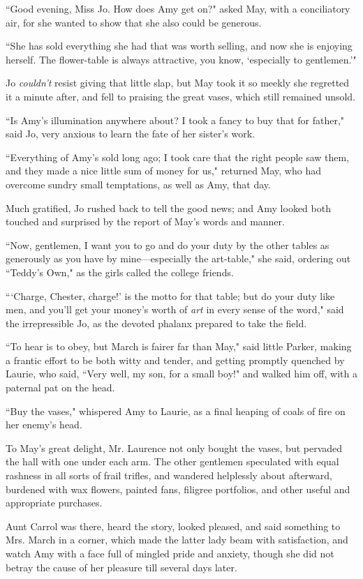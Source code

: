 ``Good evening, Miss Jo. How does Amy get on?" asked May, with a
conciliatory air, for she wanted to show that she also could be
generous.

``She has sold everything she had that was worth selling, and now she is
enjoying herself. The flower-table is always attractive, you know,
`especially to gentlemen.'"

Jo \emph{couldn't} resist giving that little slap, but
May took it so meekly she regretted it a minute after, and fell to
praising the great vases, which still remained unsold.

``Is Amy's illumination anywhere about? I took a fancy to
buy that for father," said Jo, very anxious to learn the fate of her
sister's work.

``Everything of Amy's sold long ago; I took care that the
right people saw them, and they made a nice little sum of money for us,"
returned May, who had overcome sundry small temptations, as well as Amy,
that day.

Much gratified, Jo rushed back to tell the good news; and Amy looked
both touched and surprised by the report of May's words
and manner.

``Now, gentlemen, I want you to go and do your duty by the other tables
as generously as you have by mine---especially the art-table," she said,
ordering out ``Teddy's Own," as the girls called the
college friends.

```Charge, Chester, charge!' is the
motto for that table; but do your duty like men, and
you'll get your money's worth of
\emph{art} in every sense of the word," said the irrepressible Jo, as
the devoted phalanx prepared to take the field.

``To hear is to obey, but March is fairer far than May," said little
Parker, making a frantic effort to be both witty and tender, and getting
promptly quenched by Laurie, who said, ``Very well, my son, for a small
boy!" and walked him off, with a paternal pat on the head.

``Buy the vases," whispered Amy to Laurie, as a final heaping of coals of
fire on her enemy's head.

To May's great delight, Mr. Laurence not only bought the
vases, but pervaded the hall with one under each arm. The other
gentlemen speculated with equal rashness in all sorts of frail trifles,
and wandered helplessly about afterward, burdened with wax flowers,
painted fans, filigree portfolios, and other useful and appropriate
purchases.

Aunt Carrol was there, heard the story, looked pleased, and said
something to Mrs. March in a corner, which made the latter lady beam
with satisfaction, and watch Amy with a face full of mingled pride and
anxiety, though she did not betray the cause of her pleasure till
several days later.

